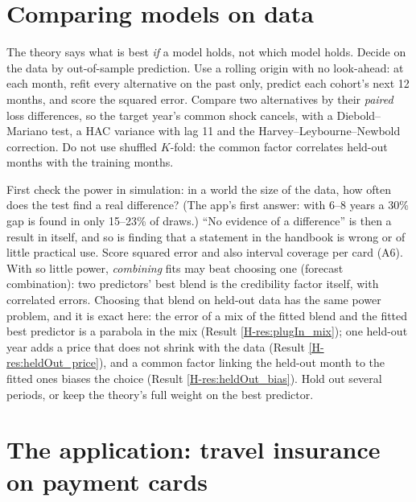 \documentclass[10pt]{article}
\newcommand{\hb}[1]{\ref*{H-#1}}
\begin{document}
\section{Comparing models on data}\label{sec:method}

The theory says what is best \emph{if} a model holds, not which model holds. Decide on the data by
out-of-sample prediction. Use a rolling origin with no look-ahead: at each month, refit every
alternative on the past only, predict each cohort's next 12 months, and score the squared error.
Compare two alternatives by their \emph{paired} loss differences, so the target year's common
shock cancels, with a Diebold--Mariano test, a HAC variance with lag 11 and the
Harvey--Leybourne--Newbold correction. Do not use shuffled $K$-fold: the common factor correlates
held-out months with the training months.

First check the power in simulation: in a world the size of the data, how often does the test find
a real difference? (The app's first answer: with 6--8 years a 30\% gap is found in only 15--23\% of
draws.) ``No evidence of a difference'' is then a result in itself, and so is finding that a
statement in the handbook is wrong or of little practical use. Score squared error and also interval
coverage per card (A6). With so little power, \emph{combining} fits may beat choosing one
(forecast combination): two predictors' best blend is the credibility factor itself, with
correlated errors. Choosing that blend on held-out data has the same power problem, and it is
exact here: the error of a mix of the fitted blend and the fitted best predictor is a parabola in
the mix (Result \hb{res:plugIn_mix}); one held-out year adds a price that does not shrink with
the data (Result \hb{res:heldOut_price}), and a common factor linking the held-out month to the
fitted ones biases the choice (Result \hb{res:heldOut_bias}). Hold out several periods, or keep
the theory's full weight on the best predictor.

\section{The application: travel insurance on payment cards}\label{sec:cards}
\end{document}
